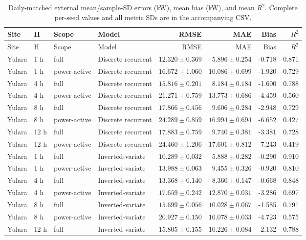 \begin{longtable}{lll l rrrr}
\caption{Daily-matched external mean/sample-SD errors (kW), mean bias (kW), and mean $R^2$. Complete per-seed values and all metric SDs are in the accompanying CSV.}\label{tabs:externalDailymatched}\\
\toprule Site & H & Scope & Model & RMSE & MAE & Bias & $R^2$\\\midrule
\endfirsthead\toprule Site & H & Scope & Model & RMSE & MAE & Bias & $R^2$\\\midrule\endhead
Yulara & 1 h & full & Discrete recurrent & $12.320\pm0.369$ & $5.896\pm0.254$ & -0.718 & 0.871\\
Yulara & 1 h & power-active & Discrete recurrent & $16.672\pm1.060$ & $10.086\pm0.699$ & -1.920 & 0.729\\
Yulara & 4 h & full & Discrete recurrent & $15.816\pm0.201$ & $8.184\pm0.184$ & -1.600 & 0.788\\
Yulara & 4 h & power-active & Discrete recurrent & $21.271\pm0.759$ & $13.773\pm0.686$ & -4.459 & 0.560\\
Yulara & 8 h & full & Discrete recurrent & $17.866\pm0.456$ & $9.606\pm0.284$ & -2.948 & 0.729\\
Yulara & 8 h & power-active & Discrete recurrent & $24.289\pm0.859$ & $16.994\pm0.694$ & -6.652 & 0.427\\
Yulara & 12 h & full & Discrete recurrent & $17.883\pm0.759$ & $9.740\pm0.381$ & -3.381 & 0.728\\
Yulara & 12 h & power-active & Discrete recurrent & $24.460\pm1.206$ & $17.601\pm0.812$ & -7.243 & 0.419\\
Yulara & 1 h & full & Inverted-variate & $10.289\pm0.032$ & $5.888\pm0.282$ & -0.290 & 0.910\\
Yulara & 1 h & power-active & Inverted-variate & $13.988\pm0.063$ & $9.455\pm0.326$ & -0.920 & 0.810\\
Yulara & 4 h & full & Inverted-variate & $13.368\pm0.140$ & $8.360\pm0.147$ & -0.668 & 0.848\\
Yulara & 4 h & power-active & Inverted-variate & $17.659\pm0.242$ & $12.870\pm0.031$ & -3.286 & 0.697\\
Yulara & 8 h & full & Inverted-variate & $15.699\pm0.056$ & $10.028\pm0.067$ & -1.585 & 0.791\\
Yulara & 8 h & power-active & Inverted-variate & $20.927\pm0.150$ & $16.078\pm0.033$ & -4.723 & 0.575\\
Yulara & 12 h & full & Inverted-variate & $15.805\pm0.155$ & $10.226\pm0.084$ & -2.132 & 0.788\\

\end{longtable}
